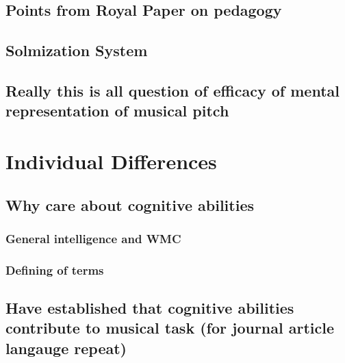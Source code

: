 \documentclass[]{book}
\theoremstyle{definition}
\theoremstyle{definition}
\theoremstyle{definition}
\theoremstyle{remark}
\begin{document}
\hypertarget{points-from-royal-paper-on-pedagogy}{%
\section{Points from Royal Paper on
pedagogy}\label{points-from-royal-paper-on-pedagogy}}

\hypertarget{solmization-system}{%
\section{Solmization System}\label{solmization-system}}

\hypertarget{really-this-is-all-question-of-efficacy-of-mental-representation-of-musical-pitch}{%
\section{Really this is all question of efficacy of mental
representation of musical
pitch}\label{really-this-is-all-question-of-efficacy-of-mental-representation-of-musical-pitch}}

\hypertarget{individual-differences}{%
\chapter{Individual Differences}\label{individual-differences}}

\hypertarget{why-care-about-cognitive-abilities}{%
\section{Why care about cognitive
abilities}\label{why-care-about-cognitive-abilities}}

\hypertarget{general-intelligence-and-wmc}{%
\subsection{General intelligence and
WMC}\label{general-intelligence-and-wmc}}

\hypertarget{defining-of-terms}{%
\subsection{Defining of terms}\label{defining-of-terms}}

\hypertarget{have-established-that-cognitive-abilities-contribute-to-musical-task-for-journal-article-langauge-repeat}{%
\section{Have established that cognitive abilities contribute to musical
task (for journal article langauge
repeat)}\label{have-established-that-cognitive-abilities-contribute-to-musical-task-for-journal-article-langauge-repeat}}
\end{document}
